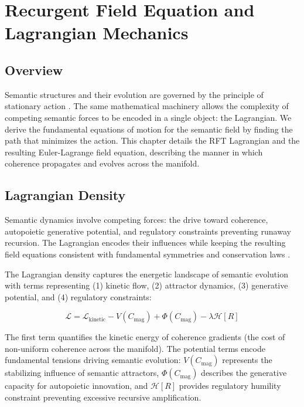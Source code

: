 \chapter{Recurgent Field Equation and Lagrangian Mechanics}

\section{Overview}

Semantic structures and their evolution are governed by the principle of stationary action \autocite{GoldsteinPooleSafko2002, Arnold1989}. The same mathematical machinery allows the complexity of competing semantic forces to be encoded in a single object: the Lagrangian. We derive the fundamental equations of motion for the semantic field by finding the path that minimizes the action. This chapter details the RFT Lagrangian and the resulting Euler-Lagrange field equation, describing the manner in which coherence propagates and evolves across the manifold.

\section{Lagrangian Density}

Semantic dynamics involve competing forces: the drive toward coherence, autopoietic generative potential, and regulatory constraints preventing runaway recursion. The Lagrangian encodes their influences while keeping the resulting field equations consistent with fundamental symmetries and conservation laws \autocite{Lagrange1788, Euler1744, LandauLifshitz1975}.

The Lagrangian density captures the energetic landscape of semantic evolution with terms representing (1) kinetic flow, (2) attractor dynamics, (3) generative potential, and (4) regulatory constraints:

\begin{equation}
\mathcal{L} = \mathcal{L}_{\text{kinetic}} - V(C_{\text{mag}}) + \Phi(C_{\text{mag}}) - \lambda \mathcal{H}[R]
\end{equation}

The first term quantifies the kinetic energy of coherence gradients (the cost of non-uniform coherence across the manifold). The potential terms encode fundamental tensions driving semantic evolution: \(V(C_{\text{mag}})\) represents the stabilizing influence of semantic attractors, \(\Phi(C_{\text{mag}})\) describes the generative capacity for autopoietic innovation, and \(\mathcal{H}[R]\) provides regulatory humility constraint preventing excessive recursive amplification.

